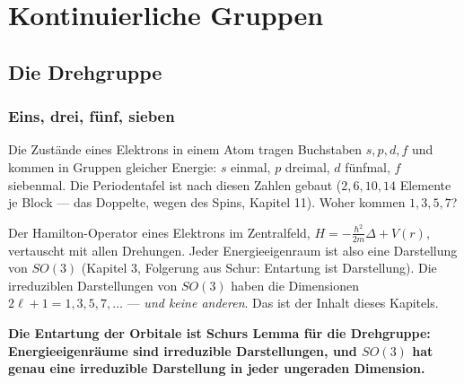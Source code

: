 \part{Kontinuierliche Gruppen}

\chapter{Die Drehgruppe}

\section{Eins, drei, fünf, sieben}

\begin{merksatz}
Die Zustände eines Elektrons in einem Atom tragen Buchstaben $s, p, d, f$ und kommen in Gruppen gleicher Energie: $s$ einmal, $p$ dreimal, $d$ fünfmal, $f$ siebenmal. Die Periodentafel ist nach diesen Zahlen gebaut ($2, 6, 10, 14$ Elemente je Block --- das Doppelte, wegen des Spins, Kapitel 11). Woher kommen $1, 3, 5, 7$?

Der Hamilton-Operator eines Elektrons im Zentralfeld, $H = -\frac{\hbar^{2}}{2m}\Delta + V(r)$, vertauscht mit allen Drehungen. Jeder Energieeigenraum ist also eine Darstellung von $SO(3)$ (Kapitel 3, Folgerung aus Schur: Entartung ist Darstellung). Die irreduziblen Darstellungen von $SO(3)$ haben die Dimensionen $2\ell + 1 = 1, 3, 5, 7, \dots$ --- \emph{und keine anderen}. Das ist der Inhalt dieses Kapitels.

\begin{center}
\end{center}

\begin{center}
\begin{minipage}{0.9\textwidth}
\textbf{Die Entartung der Orbitale ist Schurs Lemma für die Drehgruppe: Energieeigenräume sind irreduzible Darstellungen, und $SO(3)$ hat genau eine irreduzible Darstellung in jeder ungeraden Dimension.}
\end{minipage}
\end{center}


\end{merksatz}
